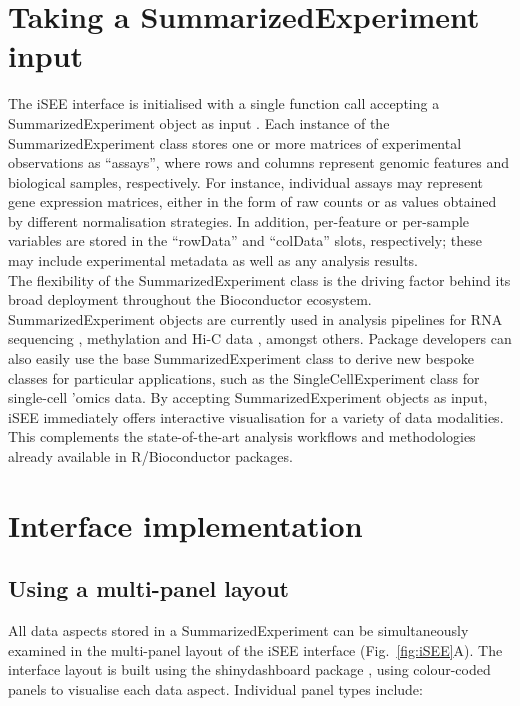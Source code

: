\documentclass[10pt,a4paper,twocolumn]{article}
\begin{document}
\section*{Taking a SummarizedExperiment input}
The iSEE interface is initialised with a single function call accepting a SummarizedExperiment object as input \citep{huber2015orchestrating}.
Each instance of the SummarizedExperiment class stores one or more matrices of experimental observations as ``assays'', where rows and columns represent genomic features and biological samples, respectively.
For instance, individual assays may represent gene expression matrices, either in the form of raw counts or as values obtained by different normalisation strategies.
In addition, per-feature or per-sample variables are stored in the ``rowData'' and ``colData'' slots, respectively; these may include experimental metadata as well as any analysis results.\\

The flexibility of the SummarizedExperiment class is the driving factor behind its broad deployment throughout the Bioconductor ecosystem.
SummarizedExperiment objects are currently used in analysis pipelines for RNA sequencing \citep{love2014moderated}, methylation \citep{aryee2014minfi} and Hi-C data \citep{lun2016infrastructure}, amongst others.
Package developers can also easily use the base SummarizedExperiment class to derive new bespoke classes for particular applications, such as the SingleCellExperiment class for single-cell 'omics data.
By accepting SummarizedExperiment objects as input, iSEE immediately offers interactive visualisation for a variety of data modalities.
This complements the state-of-the-art analysis workflows and methodologies already available in R/Bioconductor packages. \\

\section*{Interface implementation}

\subsection*{Using a multi-panel layout}
All data aspects stored in a SummarizedExperiment can be simultaneously examined in the multi-panel layout of the iSEE interface (Fig.~\ref{fig:iSEE}A).
The interface layout is built using the shinydashboard package \citep{chang2018shinydashboard}, using colour-coded panels to visualise each data aspect.
Individual panel types include:
\end{document}
